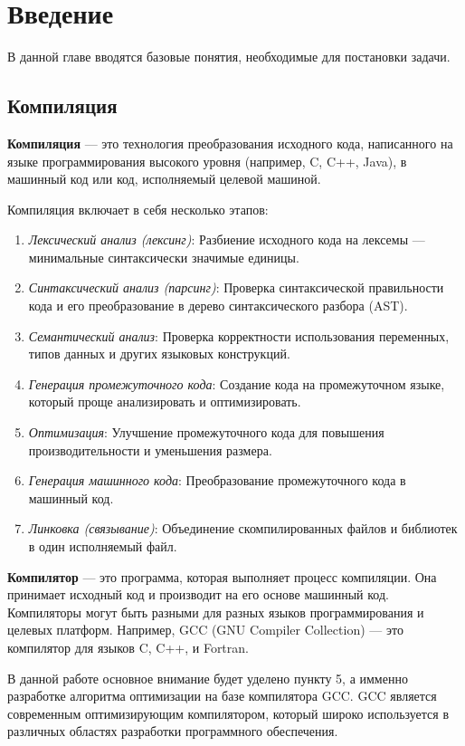 \section{Введение}
\label{sec:Chapter0} 

В данной главе вводятся базовые понятия, необходимые для постановки задачи.

\subsection{Компиляция}
\textbf{Компиляция} — это технология преобразования исходного кода, написанного на языке программирования высокого уровня (например, C, C++, Java), в машинный код или код, исполняемый целевой машиной.

Компиляция включает в себя несколько этапов:
\begin{enumerate}
    \item \textit{Лексический анализ (лексинг)}: Разбиение исходного кода на лексемы — минимальные синтаксически значимые единицы.
    \item \textit{Синтаксический анализ (парсинг)}: Проверка синтаксической правильности кода и его преобразование в дерево синтаксического разбора (AST).
    \item \textit{Семантический анализ}: Проверка корректности использования переменных, типов данных и других языковых конструкций.
    \item \textit{Генерация промежуточного кода}: Создание кода на промежуточном языке, который проще анализировать и оптимизировать.
    \item \textit{Оптимизация}: Улучшение промежуточного кода для повышения производительности и уменьшения размера.
    \item \textit{Генерация машинного кода}: Преобразование промежуточного кода в машинный код.
    \item \textit{Линковка (связывание)}: Объединение скомпилированных файлов и библиотек в один исполняемый файл.
\end{enumerate}

\textbf{Компилятор} — это программа, которая выполняет процесс компиляции. Она принимает исходный код и производит на его основе машинный код. Компиляторы могут быть разными для разных языков программирования и целевых платформ. Например, GCC (GNU Compiler Collection) — это компилятор для языков C, C++, и Fortran. %

В данной работе основное внимание будет уделено пункту 5, а имменно разработке алгоритма оптимизации на базе компилятора GCC. GCC является современным оптимизирующим компилятором, который широко используется в различных областях разработки программного обеспечения.

